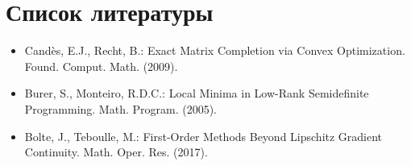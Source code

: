 \documentclass[a4paper,11pt]{article}
\begin{document}
\section*{Список литературы}
\begin{itemize}
    \item Cand\`es, E.J., Recht, B.: Exact Matrix Completion via Convex Optimization. Found. Comput. Math. (2009).
    \item Burer, S., Monteiro, R.D.C.: Local Minima in Low-Rank Semidefinite Programming. Math. Program. (2005).
    \item Bolte, J., Teboulle, M.: First-Order Methods Beyond Lipschitz Gradient Continuity. Math. Oper. Res. (2017).
\end{itemize}
\end{document}
